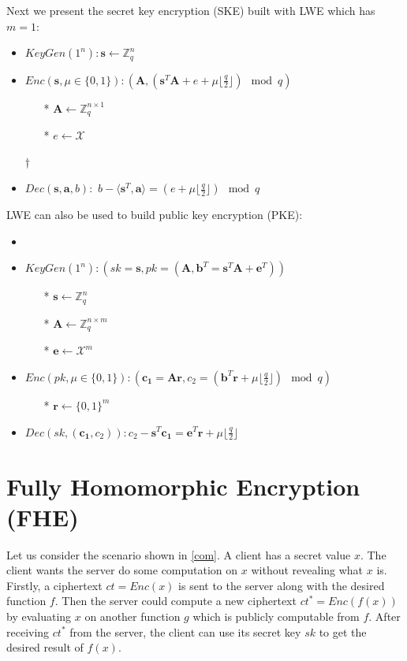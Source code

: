 \documentclass[usletter]{article}
\begin{document}
Next we present the secret key encryption (SKE) built with LWE which has $m=1$:
\begin{itemize}
\item $KeyGen(1^n): \pmb{s}\leftarrow\mathbb{Z}_q^n$
\item $Enc(\pmb{s},\mu\in\{0,1\}): (\pmb{A}, (\pmb{s}^T\pmb{A}+e+\mu\lfloor\frac{q}{2}\rfloor)\mod q)$
\begin{itemize}
\item[*] $\pmb{A}\leftarrow\mathbb{Z}_q^{n\times 1}$
\item[*] $e\leftarrow\mathcal{X}$
\end{itemize}†

\item $Dec(\pmb{s},\pmb{a},b):$ $b-\langle\pmb{s}^T,\pmb{a}\rangle=(e+\mu\lfloor\frac{q}{2}\rfloor) \mod q$
\end{itemize}

LWE can also be used to build public key encryption (PKE):
\begin{itemize}
\item \item $KeyGen(1^n): (sk=\pmb{s},pk=(\pmb{A}, \pmb{b}^T=\pmb{s}^T\pmb{A}+\pmb{e}^T))$
\begin{itemize}
\item[*]  $\pmb{s}\leftarrow\mathbb{Z}_q^n$
\item[*] $\pmb{A}\leftarrow\mathbb{Z}_q^{n\times m}$
\item[*] $\pmb{e}\leftarrow\mathcal{X}^m$
\end{itemize}

\item $Enc(pk,\mu\in\{0,1\}): (\pmb{c_1}=\pmb{A}\pmb{r}, c_2=(\pmb{b}^T\pmb{r}+\mu\lfloor\frac{q}{2}\rfloor)\mod q)$
\begin{itemize}
\item[*]  $\pmb{r}\longleftarrow\{0,1\}^m$
\end{itemize}

\item $Dec(sk,(\pmb{c_1},c_2)): c_2-\pmb{s}^T\pmb{c_1}=\pmb{e}^T\pmb{r}+\mu\lfloor\frac{q}{2}\rfloor$
\end{itemize}


\section{Fully Homomorphic Encryption (FHE)}

Let us consider the scenario shown in \ref{com}. A client has a secret value $x$. The client wants the server do some computation on $x$ without revealing what $x$ is. Firstly, a ciphertext $ct=Enc(x)$ is sent to the server along with the desired function $f$. Then the server could compute a new ciphertext $ct^*=Enc(f(x))$ by evaluating $x$ on another function $g$ which is publicly computable from $f$. After receiving $ct^*$ from the server, the client can use its secret key $sk$ to get the desired result of $f(x)$.
\end{document}
